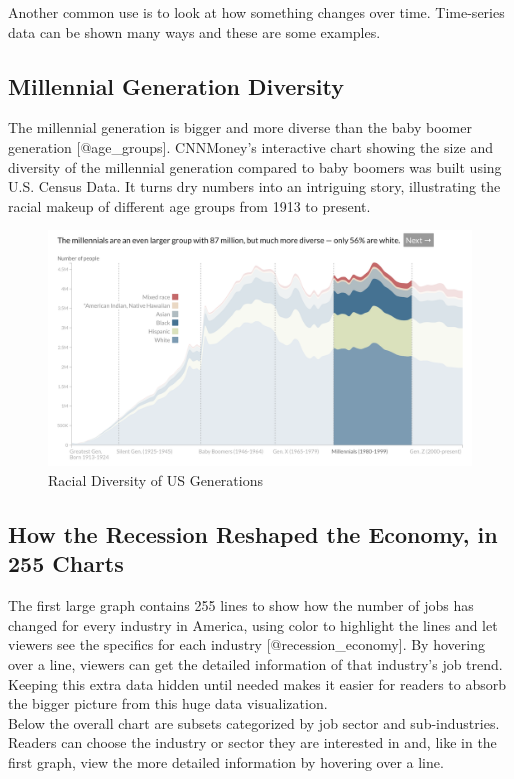 \documentclass[]{book}
\theoremstyle{definition}
\theoremstyle{definition}
\theoremstyle{definition}
\theoremstyle{remark}
\begin{document}
Another common use is to look at how something changes over time.
Time-series data can be shown many ways and these are some examples.

\subsection{Millennial Generation
Diversity}\label{millennial-generation-diversity}

The millennial generation is bigger and more diverse than the baby
boomer generation {[}@age\_groups{]}. CNNMoney's interactive chart
showing the size and diversity of the millennial generation compared to
baby boomers was built using U.S. Census Data. It turns dry numbers into
an intriguing story, illustrating the racial makeup of different age
groups from 1913 to present.

\begin{figure}
\centering
\includegraphics{images/millenials_diversity.png}
\caption{Racial Diversity of US Generations}
\end{figure}

\subsection{How the Recession Reshaped the Economy, in 255
Charts}\label{how-the-recession-reshaped-the-economy-in-255-charts}

The first large graph contains 255 lines to show how the number of jobs
has changed for every industry in America, using color to highlight the
lines and let viewers see the specifics for each industry
{[}@recession\_economy{]}. By hovering over a line, viewers can get the
detailed information of that industry's job trend. Keeping this extra
data hidden until needed makes it easier for readers to absorb the
bigger picture from this huge data visualization.\\
Below the overall chart are subsets categorized by job sector and
sub-industries. Readers can choose the industry or sector they are
interested in and, like in the first graph, view the more detailed
information by hovering over a line.
\end{document}
